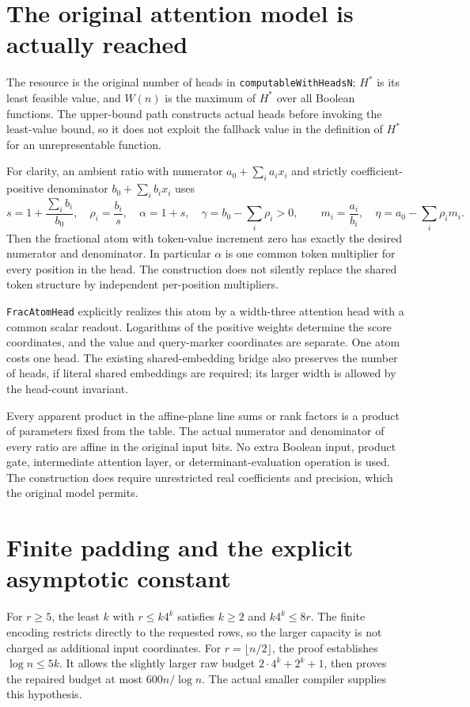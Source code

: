 \documentclass[11pt]{article}
\begin{document}
\section{The original attention model is actually reached}
The resource is the original number of heads in
\texttt{computableWithHeadsN}; $H^{\ast}$ is its least feasible value,
and $W(n)$ is the maximum of $H^{\ast}$ over all Boolean functions.
The upper-bound path constructs actual heads before invoking the
least-value bound, so it does not exploit the fallback value in the
definition of $H^{\ast}$ for an unrepresentable function.

For clarity, an ambient ratio with numerator $a_0+\sum_i a_ix_i$ and
strictly coefficient-positive denominator $b_0+\sum_i b_ix_i$ uses
\[
 s=1+\frac{\sum_i b_i}{b_0},\quad
 \rho_i=\frac{b_i}{s},\quad \alpha=1+s,\quad
 \gamma=b_0-\sum_i\rho_i>0,
 \qquad m_i=\frac{a_i}{b_i},\quad
 \eta=a_0-\sum_i\rho_i m_i.
\]
Then the fractional atom with token-value increment zero has exactly
the desired numerator and denominator. In particular $\alpha$ is one
common token multiplier for every position in the head. The construction
does not silently replace the shared token structure by independent
per-position multipliers.

\texttt{FracAtomHead} explicitly realizes this atom by a width-three
attention head with a common scalar readout. Logarithms of the positive
weights determine the score coordinates, and the value and query-marker
coordinates are separate. One atom costs one head. The existing
shared-embedding bridge also preserves the number of heads, if literal
shared embeddings are required; its larger width is allowed by the
head-count invariant.

Every apparent product in the affine-plane line sums or rank factors
is a product of parameters fixed from the table. The actual numerator
and denominator of every ratio are affine in the original input bits.
No extra Boolean input, product gate, intermediate attention layer,
or determinant-evaluation operation is used. The construction does
require unrestricted real coefficients and precision, which the
original model permits.

\section{Finite padding and the explicit asymptotic constant}
For $r\geq5$, the least $k$ with $r\leq k4^k$ satisfies
$k\geq2$ and $k4^k\leq8r$. The finite encoding restricts directly
to the requested rows, so the larger capacity is not charged as
additional input coordinates. For $r=\lfloor n/2\rfloor$, the proof
establishes $\log n\leq5k$. It allows the slightly larger raw budget
$2\cdot4^k+2^k+1$, then proves the repaired budget at most
$600n/\log n$. The actual smaller compiler supplies this hypothesis.
\end{document}
